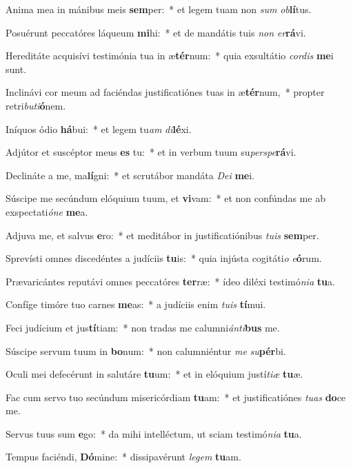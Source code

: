 \item Anima mea in mánibus meis \textbf{sem}per:~* et legem tuam non \textit{sum} \textit{ob}\textbf{lí}tus.
\item Posuérunt peccatóres láqueum \textbf{mi}hi:~* et de mandátis tuis \textit{non} \textit{er}\textbf{rá}vi.
\item Hereditáte acquisívi testimónia tua in æ\textbf{tér}num:~* quia exsultátio \textit{cor}\textit{dis} \textbf{me}i sunt.
\item Inclinávi cor meum ad faciéndas justificatiónes tuas in æ\textbf{tér}num,~* propter retri\textit{bu}\textit{ti}\textbf{ó}nem.
\item Iníquos ódio \textbf{há}bui:~* et legem tu\textit{am} \textit{di}\textbf{lé}xi.
\item Adjútor et suscéptor meus \textbf{es} tu:~* et in verbum tuum su\textit{per}\textit{spe}\textbf{rá}vi.
\item Declináte a me, ma\textbf{lí}gni:~* et scrutábor mandáta \textit{De}\textit{i} \textbf{me}i.
\item Súscipe me secúndum elóquium tuum, et \textbf{vi}vam:~* et non confúndas me ab exspectati\textit{ó}\textit{ne} \textbf{me}a.
\item Adjuva me, et salvus \textbf{e}ro:~* et meditábor in justificatiónibus \textit{tu}\textit{is} \textbf{sem}per.
\item Sprevísti omnes discedéntes a judíciis \textbf{tu}is:~* quia injústa cogitáti\textit{o} \textit{e}\textbf{ó}rum.
\item Prævaricántes reputávi omnes peccatóres \textbf{ter}ræ:~* ídeo diléxi testimó\textit{ni}\textit{a} \textbf{tu}a.
\item Confíge timóre tuo carnes \textbf{me}as:~* a judíciis enim \textit{tu}\textit{is} \textbf{tí}mui.
\item Feci judícium et jus\textbf{tí}tiam:~* non tradas me calumni\textit{án}\textit{ti}\textbf{bus} me.
\item Súscipe servum tuum in \textbf{bo}num:~* non calumniéntur \textit{me} \textit{su}\textbf{pér}bi.
\item Oculi mei defecérunt in salutáre \textbf{tu}um:~* et in elóquium justí\textit{ti}\textit{æ} \textbf{tu}æ.
\item Fac cum servo tuo secúndum misericórdiam \textbf{tu}am:~* et justificatiónes \textit{tu}\textit{as} \textbf{do}ce me.
\item Servus tuus sum \textbf{e}go:~* da mihi intelléctum, ut sciam testimó\textit{ni}\textit{a} \textbf{tu}a.
\item Tempus faciéndi, \textbf{Dó}mine:~* dissipavérunt \textit{le}\textit{gem} \textbf{tu}am.
